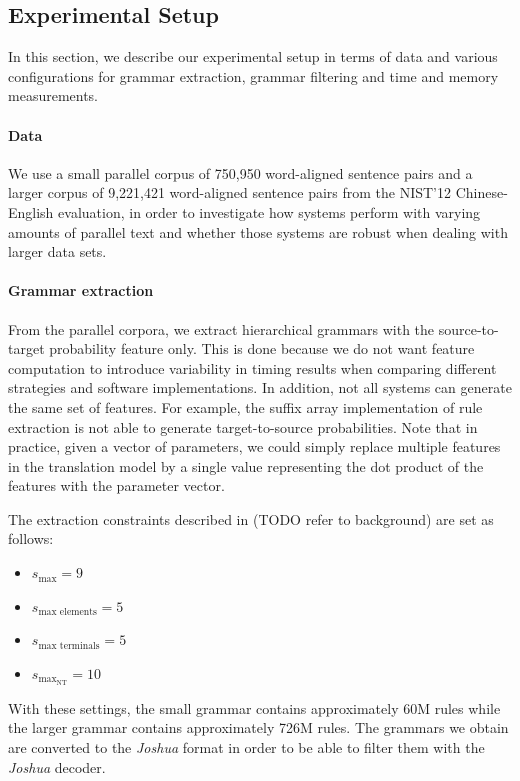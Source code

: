 \subsection{Experimental Setup}

In this section, we describe our experimental setup in terms of data and various
configurations for grammar extraction, grammar filtering and
time and memory measurements.
%
\paragraph{Data} We use a small parallel corpus of 750,950 word-aligned sentence
    pairs and a larger corpus of 9,221,421 word-aligned sentence pairs from the
    NIST'12 Chinese-English evaluation, in order to investigate how systems perform
    with varying amounts of parallel text and whether those systems are robust
    when dealing with larger data sets.
%
\paragraph{Grammar extraction} From the parallel corpora, we extract hierarchical
    grammars with the source-to-target probability feature only. This is done
    because we do
    not want feature computation to introduce variability in timing results when
    comparing different strategies and software implementations. In addition, not
    all systems can generate the same set of features. For example,
    the suffix array implementation of rule extraction is not able to generate
    target-to-source probabilities. Note that in practice, given a vector of
    parameters, we could simply replace multiple features in the translation
    model by a single value representing the dot product of the features with
    the parameter vector.

    The extraction constraints described in (TODO refer to background)
    are set as follows:
%
\begin{itemize}
  \item $ s_{\text{max}}= 9$
  \item $s_{\text{max elements}} = 5$
  \item $s_{\text{max terminals}} = 5$ %
  \item $s_{\text{max}_{\text{NT}}} = 10$ %
\end{itemize}
%
With these settings, the small grammar contains approximately 60M rules while the 
larger grammar contains approximately 726M rules. The grammars we obtain are
converted to the \emph{Joshua} format in order to be able to filter them
with the \emph{Joshua} decoder.
%
